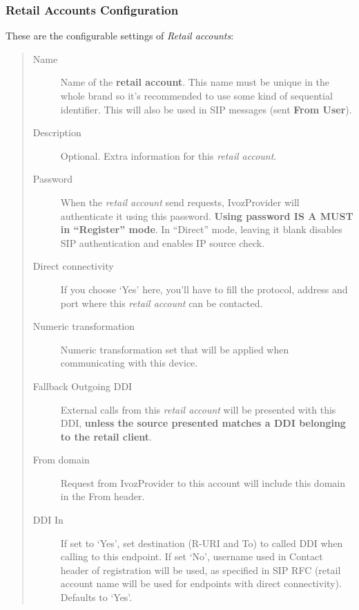 \documentclass[letterpaper,10pt,english]{sphinxmanual}
\begin{document}
\subsubsection{Retail Accounts Configuration}
\label{administration_portal/client/retail/retail_accounts:retail-accounts-configuration}
These are the configurable settings of \emph{Retail accounts}:
\begin{quote}
\begin{description}
\item[{Name}] \leavevmode
Name of the \textbf{retail account}. This name must be unique in the whole brand so
it's recommended to use some kind of sequential identifier. This will also be used
in SIP messages (sent \textbf{From User}).

\item[{Description}] \leavevmode
Optional. Extra information for this \emph{retail account}.

\item[{Password}] \leavevmode
When the \emph{retail account} send requests, IvozProvider will authenticate it using
this password. \textbf{Using password IS A MUST in ``Register'' mode}. In ``Direct'' mode,
leaving it blank disables SIP authentication and enables IP source check.

\item[{Direct connectivity}] \leavevmode
If you choose `Yes' here, you'll have to fill the protocol, address and
port where this \emph{retail account} can be contacted.

\item[{Numeric transformation}] \leavevmode
Numeric transformation set that will be applied when communicating with this device.

\item[{Fallback Outgoing DDI}] \leavevmode
External calls from this \emph{retail account} will be presented with this DDI, \textbf{unless
the source presented matches a DDI belonging to the retail client}.

\item[{From domain}] \leavevmode
Request from IvozProvider to this account will include this domain in
the From header.

\item[{DDI In}] \leavevmode
If set to `Yes', set destination (R-URI and To) to called DDI when calling to this endpoint. If set `No', username
used in Contact header of registration will be used, as specified in SIP RFC (retail account name will be used for
endpoints with direct connectivity). Defaults to `Yes'.


\end{description}
\end{quote}
\end{document}
